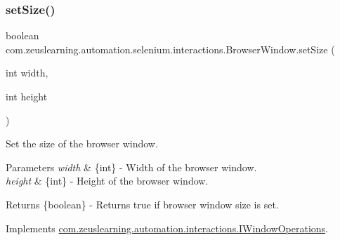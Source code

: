 \hypertarget{classcom_1_1zeuslearning_1_1automation_1_1selenium_1_1interactions_1_1BrowserWindow_a471ae0f451cf2fb3a931478d114923c2}{}\label{classcom_1_1zeuslearning_1_1automation_1_1selenium_1_1interactions_1_1BrowserWindow_a471ae0f451cf2fb3a931478d114923c2} 
\subsubsection{\texorpdfstring{set\+Size()}{setSize()}}
{\footnotesize\ttfamily boolean com.\+zeuslearning.\+automation.\+selenium.\+interactions.\+Browser\+Window.\+set\+Size (\begin{DoxyParamCaption}\item[{int}]{width,  }\item[{int}]{height }\end{DoxyParamCaption})\hspace{0.3cm}{\ttfamily [inline]}}

Set the size of the browser window.


\begin{DoxyParams}{Parameters}
{\em width} & \{int\} -\/ Width of the browser window. \\
\hline
{\em height} & \{int\} -\/ Height of the browser window.\\
\hline
\end{DoxyParams}
\begin{DoxyReturn}{Returns}
\{boolean\} -\/ Returns {\ttfamily true} if browser window size is set. 
\end{DoxyReturn}


Implements \hyperlink{interfacecom_1_1zeuslearning_1_1automation_1_1interactions_1_1IWindowOperations_ad3cb79f49fa700778fe85eb272c8385f}{com.\+zeuslearning.\+automation.\+interactions.\+I\+Window\+Operations}.

\hypertarget{classcom_1_1zeuslearning_1_1automation_1_1selenium_1_1interactions_1_1BrowserWindow_a4579549812a37d3984bda3e5facb2a2d}{}\label{classcom_1_1zeuslearning_1_1automation_1_1selenium_1_1interactions_1_1BrowserWindow_a4579549812a37d3984bda3e5facb2a2d} 
